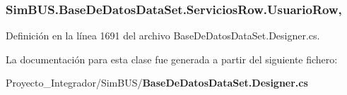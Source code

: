 \subsubsection[{Usuario\-Row}]{ Sim\-B\-U\-S.\-Base\-De\-Datos\-Data\-Set.\-Servicios\-Row.\-Usuario\-Row\hspace{0.3cm}{\ttfamily [get]}, {\ttfamily [set]}}\label{class_sim_b_u_s_1_1_base_de_datos_data_set_1_1_servicios_row_ac961a907a72936cb68d4ee3ffed5ae08}


Definición en la línea 1691 del archivo Base\-De\-Datos\-Data\-Set.\-Designer.\-cs.



La documentación para esta clase fue generada a partir del siguiente fichero\-:\begin{DoxyCompactItemize}
\item 
Proyecto\-\_\-\-Integrador/\-Sim\-B\-U\-S/{\bf Base\-De\-Datos\-Data\-Set.\-Designer.\-cs}\end{DoxyCompactItemize}
